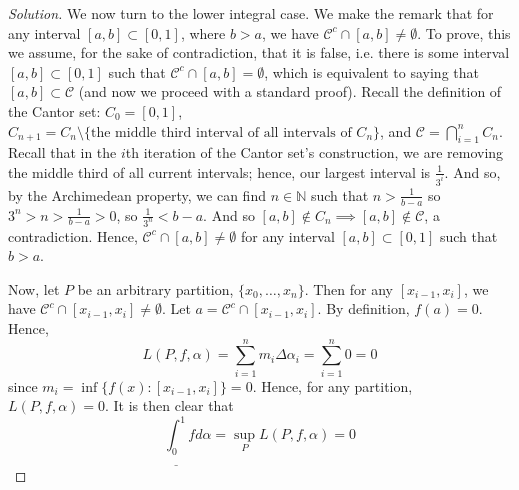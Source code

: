 \documentclass{article}
\newcommand{\N}{{\mathbb N}}
\begin{document}
\begin{proof}[Solution]
	We now turn to the lower integral case.
	We make the remark that for any interval $[a,b] \subset [0,1]$,
	where $b > a$,
	we have $\mathcal{C}^c \cap [a,b] \neq \emptyset$.
	To prove, this we assume, for the sake of contradiction,
	that it is false,
	i.e. there is some interval $[a,b] \subset [0,1]$ such that
	$\mathcal{C}^c \cap [a,b] = \emptyset$,
	which is equivalent to saying that $[a,b] \subset \mathcal{C}$
	(and now we proceed with a standard proof).
	Recall the definition of the Cantor set:
	$C_0 = [0,1]$, $C_{n+1} = C_n \setminus \{\text{the middle third interval
	of all intervals of }C_n\}$,
	and $\mathcal{C} = \bigcap_{i=1}^n C_n$.
	Recall that in the $i$th iteration of the Cantor set's construction,
	we are removing the middle third of all current intervals;
	hence, our largest interval is $\displaystyle\frac{1}{3^i}$.
	And so, by the Archimedean property,
	we can find $n \in \N$ such that $n > \frac{1}{b-a}$ so
	$3^n > n > \frac{1}{b-a} > 0$,
	so $\frac{1}{3^n} < b-a$.
	And so $[a,b] \not\in C_n \implies [a,b] \not\in \mathcal{C}$,
	a contradiction.
	Hence, $\mathcal{C}^c\cap[a,b] \neq \emptyset$ for any interval
	$[a,b] \subset [0,1]$ such that $b > a$.

	Now, let $P$ be an arbitrary partition, $\{x_0,\dots,x_n\}$.
	Then for any $[x_{i-1},x_i]$, we have $\mathcal{C}^c\cap[x_{i-1},x_i]\neq\emptyset$.
	Let $a = \mathcal{C}^c\cap[x_{i-1},x_i]$.
	By definition, $f(a) = 0$.
	Hence,
	\[
		L(P,f,\alpha) = \sum_{i=1}^nm_i\Delta\alpha_i = \sum_{i=1}^n 0
		= 0
	\]
	since $m_i = \inf\{f(x) \colon [x_{i-1},x_i]\} = 0$.
	Hence, for any partition, $L(P,f,\alpha) = 0$.
	It is then clear that
	\[
		\underline{\int_0^1}fd\alpha = \sup_P L(P,f,\alpha) = 0
	\]
\end{proof}
\end{document}
